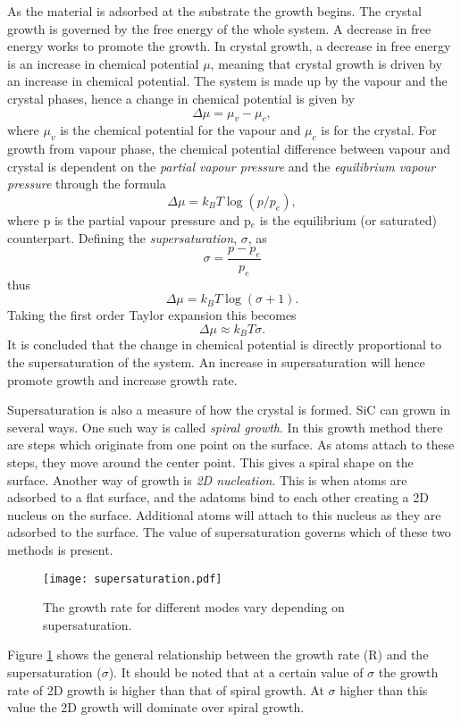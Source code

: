  As the material is adsorbed at the substrate the growth begins. The crystal growth is governed by the free energy of the whole system. A decrease in free energy works to promote the growth. In crystal growth, a decrease in free energy is an increase in chemical potential $\mu$, meaning that crystal growth is driven by an increase in chemical potential. The system is made up by the vapour and the crystal phases, hence a change in chemical potential is given by 
 \[\Delta \mu = \mu_v -\mu_c,\]
where $\mu_v$ is the chemical potential for the vapour and $\mu_c$ is for the crystal. For growth from vapour phase, the chemical potential difference between vapour and crystal is dependent on the \emph{partial vapour pressure} and the \emph{equilibrium vapour pressure} through the formula
 \[\Delta \mu = k_BT\log(p/p_e),\]
where p is the partial vapour pressure and p$_e$ is the equilibrium (or saturated) counterpart. Defining the \emph{supersaturation}, $\sigma$, as
\[\sigma = \frac{p-p_e}{p_e}\]
thus
 \[\Delta \mu = k_BT\log(\sigma+1).\]
Taking the first order Taylor expansion this becomes
\[\Delta \mu \approx k_BT\sigma.\]
 It is concluded that the change in chemical potential is directly proportional to the supersaturation of the system. An increase in supersaturation will hence promote growth and increase growth rate. 
 
 Supersaturation is also a measure of how the crystal is formed. SiC can grown in several ways. One such way is called \emph{spiral growth}. In this growth method there are steps which originate from one point on the surface. As atoms attach to these steps, they move around the center point. This gives a spiral shape on the surface. Another way of growth is \emph{2D nucleation}. This is when atoms are adsorbed to a flat surface, and the adatoms bind to each other creating a 2D nucleus on the surface. Additional atoms will attach to this nucleus as they are adsorbed to the surface. The value of supersaturation governs which of these two methods is present. 
 
\begin{figure}[h]
\begin{center}
\texttt{[image: supersaturation.pdf]}
\caption{The growth rate for different modes vary depending on supersaturation. 
\label{fig:supersaturation}}
\end{center}
\end{figure}
 
 Figure \ref{fig:supersaturation} shows the general relationship between the growth rate (R) and the supersaturation ($\sigma$). It should be noted that at a certain value of $\sigma$ the growth rate of 2D growth is higher than that of spiral growth. At $\sigma$ higher than this value the 2D growth will dominate over spiral growth. 
 
